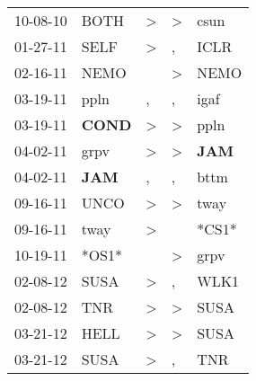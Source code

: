 \begin{supertabular}{p{0.07\textwidth}p{0.06\textwidth}p{0.02\textwidth}p{0.02\textwidth}p{0.06\textwidth}}
          10-08-10\textsuperscript{} &           BOTH\textsuperscript{} &     \textgreater &     \textgreater &           csun\textsuperscript{} \\
          01-27-11\textsuperscript{} &           SELF\textsuperscript{} &     \textgreater &                , &           ICLR\textsuperscript{} \\
          02-16-11\textsuperscript{} &           NEMO\textsuperscript{} &                  &     \textgreater &           NEMO\textsuperscript{} \\
          03-19-11\textsuperscript{} &           ppln\textsuperscript{} &                , &                , &           igaf\textsuperscript{} \\
          03-19-11\textsuperscript{} &  \textbf{COND\textsuperscript{}} &     \textgreater &     \textgreater &           ppln\textsuperscript{} \\
          04-02-11\textsuperscript{} &           grpv\textsuperscript{} &     \textgreater &     \textgreater &   \textbf{JAM\textsuperscript{}} \\
          04-02-11\textsuperscript{} &   \textbf{JAM\textsuperscript{}} &                , &                , &           bttm\textsuperscript{} \\
          09-16-11\textsuperscript{} &           UNCO\textsuperscript{} &     \textgreater &     \textgreater &           tway\textsuperscript{} \\
          09-16-11\textsuperscript{} &           tway\textsuperscript{} &     \textgreater &                  &                            *CS1* \\
          10-19-11\textsuperscript{} &                            *OS1* &                  &     \textgreater &           grpv\textsuperscript{} \\
          02-08-12\textsuperscript{} &           SUSA\textsuperscript{} &     \textgreater &                , &           WLK1\textsuperscript{} \\
          02-08-12\textsuperscript{} &            TNR\textsuperscript{} &     \textgreater &     \textgreater &           SUSA\textsuperscript{} \\
          03-21-12\textsuperscript{} &           HELL\textsuperscript{} &     \textgreater &     \textgreater &           SUSA\textsuperscript{} \\
          03-21-12\textsuperscript{} &           SUSA\textsuperscript{} &     \textgreater &                , &            TNR\textsuperscript{} \\

\end{supertabular}

